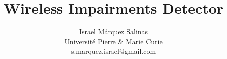 \documentclass[sigconf]{Template}
\begin{document}
\title{Wireless Impairments Detector}
\author{Israel M\'{a}rquez Salinas \\Universit\'{e} Pierre \& Marie Curie \\s.marquez.israel@gmail.com}
\maketitle











\end{document}
